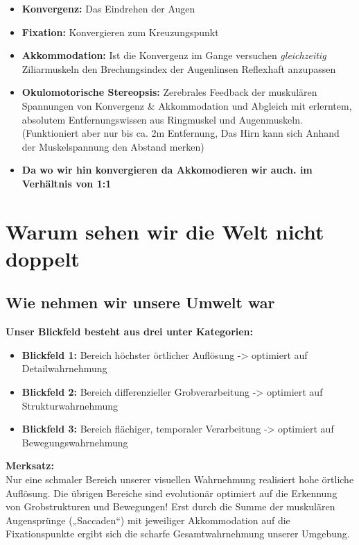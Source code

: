 \begin{itemize}

\item \textbf{Konvergenz:} Das Eindrehen der Augen
\item \textbf{Fixation:} Konvergieren zum Kreuzungspunkt
\item \textbf{Akkommodation:} Ist die Konvergenz im Gange versuchen \textit{gleichzeitig} Ziliarmuskeln den Brechungsindex der Augenlinsen Reflexhaft anzupassen
\item \textbf{Okulomotorische Stereopsis:} Zerebrales Feedback der muskulären Spannungen von Konvergenz \&	Akkommodation und Abgleich mit erlerntem, absolutem Entfernungswissen aus Ringmuskel und Augenmuskeln. (Funktioniert aber nur bis ca. 2m Entfernung, Das Hirn kann sich Anhand der Muskelspannung den Abstand merken)

\item \textbf{Da wo wir hin konvergieren da Akkomodieren wir auch. im Verhältnis von 1:1}

\end{itemize}


\section{Warum sehen wir die Welt nicht doppelt}


\subsection{Wie nehmen wir unsere Umwelt war}
\textbf{ Unser Blickfeld besteht aus drei unter Kategorien:}

\begin{itemize}
\item  \textbf{Blickfeld 1:}
Bereich höchster örtlicher Auflösung -> optimiert auf Detailwahrnehmung
\item  \textbf{Blickfeld 2:}
Bereich differenzieller Grobverarbeitung -> optimiert auf Strukturwahrnehmung
\item  \textbf{Blickfeld 3:} 
Bereich flächiger, temporaler Verarbeitung -> optimiert auf Bewegungswahrnehmung
\end{itemize}

\textbf{Merksatz:} \\

Nur eine schmaler Bereich unserer visuellen Wahrnehmung realisiert hohe örtliche Auflösung.
Die übrigen Bereiche sind evolutionär optimiert auf die Erkennung von Grobstrukturen und Bewegungen!
Erst durch die Summe der muskulären Augensprünge („Saccaden“) mit jeweiliger Akkommodation auf die
Fixationspunkte ergibt sich die scharfe Gesamtwahrnehmung unserer Umgebung.

